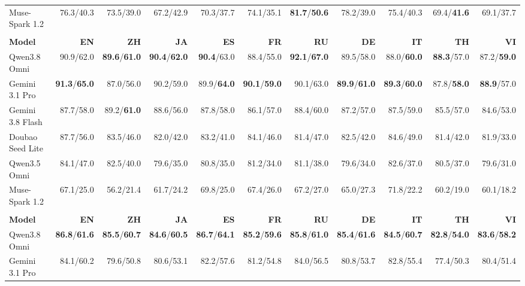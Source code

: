 \begin{table}[p]
\begin{tabular*}{\linewidth}{@{}l@{\hspace{3pt}\extracolsep{\fill}}*{10}{r}@{}}
Muse-Spark 1.2 & 76.3/40.3 & 73.5/39.0 & 67.2/42.9 & 70.3/37.7 & 74.1/35.1 & \textbf{81.7}/\textbf{50.6} & 78.2/39.0 & 75.4/40.3 & 69.4/\textbf{41.6} & 69.1/37.7 \\
\addlinespace[3pt]
\midrule
\multicolumn{11}{@{}l}{\textbf{(d) Voice Editing (VE)}} \\
\textbf{Model} & \textbf{EN} & \textbf{ZH} & \textbf{JA} & \textbf{ES} & \textbf{FR} & \textbf{RU} & \textbf{DE} & \textbf{IT} & \textbf{TH} & \textbf{VI} \\
\midrule
Qwen3.8 Omni & 90.9/62.0 & \textbf{89.6}/\textbf{61.0} & \textbf{90.4}/\textbf{62.0} & \textbf{90.4}/63.0 & 88.4/55.0 & \textbf{92.1}/\textbf{67.0} & 89.5/58.0 & 88.0/\textbf{60.0} & \textbf{88.3}/57.0 & 87.2/\textbf{59.0} \\
Gemini 3.1 Pro & \textbf{91.3}/\textbf{65.0} & 87.0/56.0 & 90.2/59.0 & 89.9/\textbf{64.0} & \textbf{90.1}/\textbf{59.0} & 90.1/63.0 & \textbf{89.9}/\textbf{61.0} & \textbf{89.3}/\textbf{60.0} & 87.8/\textbf{58.0} & \textbf{88.9}/57.0 \\
Gemini 3.8 Flash & 87.7/58.0 & 89.2/\textbf{61.0} & 88.6/56.0 & 87.8/58.0 & 86.1/57.0 & 88.4/60.0 & 87.2/57.0 & 87.5/59.0 & 85.5/57.0 & 84.6/53.0 \\
Doubao Seed Lite & 87.7/56.0 & 83.5/46.0 & 82.0/42.0 & 83.2/41.0 & 84.1/46.0 & 81.4/47.0 & 82.5/42.0 & 84.6/49.0 & 81.4/42.0 & 81.9/33.0 \\
Qwen3.5 Omni & 84.1/47.0 & 82.5/40.0 & 79.6/35.0 & 80.8/35.0 & 81.2/34.0 & 81.1/38.0 & 79.6/34.0 & 82.6/37.0 & 80.5/37.0 & 79.6/31.0 \\
Muse-Spark 1.2 & 67.1/25.0 & 56.2/21.4 & 61.7/24.2 & 69.8/25.0 & 67.4/26.0 & 67.2/27.0 & 65.0/27.3 & 71.8/22.2 & 60.2/19.0 & 60.1/18.2 \\
\addlinespace[3pt]
\midrule
\multicolumn{11}{@{}l}{\textbf{(e) Overall}} \\
\textbf{Model} & \textbf{EN} & \textbf{ZH} & \textbf{JA} & \textbf{ES} & \textbf{FR} & \textbf{RU} & \textbf{DE} & \textbf{IT} & \textbf{TH} & \textbf{VI} \\
\midrule
Qwen3.8 Omni & \textbf{86.8}/\textbf{61.6} & \textbf{85.5}/\textbf{60.7} & \textbf{84.6}/\textbf{60.5} & \textbf{86.7}/\textbf{64.1} & \textbf{85.2}/\textbf{59.6} & \textbf{85.8}/\textbf{61.0} & \textbf{85.4}/\textbf{61.6} & \textbf{84.5}/\textbf{60.7} & \textbf{82.8}/\textbf{54.0} & \textbf{83.6}/\textbf{58.2} \\
Gemini 3.1 Pro & 84.1/60.2 & 79.6/50.8 & 80.6/53.1 & 82.2/57.6 & 81.2/54.8 & 84.0/56.5 & 80.8/53.7 & 82.8/55.4 & 77.4/50.3 & 80.4/51.4 \\

\end{tabular*}
\end{table}
